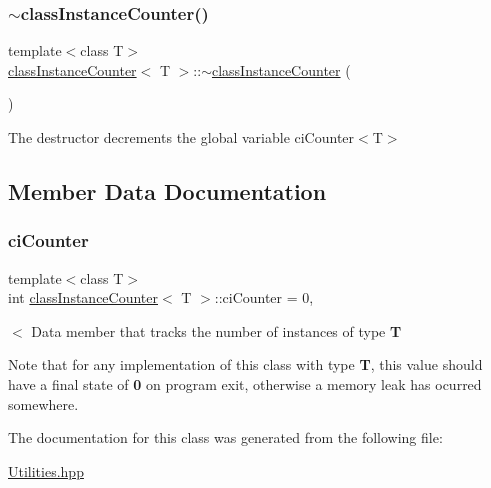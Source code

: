 \subsubsection{\texorpdfstring{$\sim$class\+Instance\+Counter()}{~classInstanceCounter()}}
{\footnotesize\ttfamily template$<$class T$>$ \\
\mbox{\hyperlink{classclass_instance_counter}{class\+Instance\+Counter}}$<$ T $>$\+::$\sim$\mbox{\hyperlink{classclass_instance_counter}{class\+Instance\+Counter}} (\begin{DoxyParamCaption}{ }\end{DoxyParamCaption})\hspace{0.3cm}{\ttfamily [inline]}}



The destructor decrements the global variable ci\+Counter$<$\+T$>$ 



\subsection{Member Data Documentation}
\mbox{\label{classclass_instance_counter_a990f94f1650bb05ade3f4deba9110806}} 
\subsubsection{\texorpdfstring{ci\+Counter}{ciCounter}}
{\footnotesize\ttfamily template$<$class T$>$ \\
int \mbox{\hyperlink{classclass_instance_counter}{class\+Instance\+Counter}}$<$ T $>$\+::ci\+Counter = 0\hspace{0.3cm}{\ttfamily [static]}, {\ttfamily [protected]}}



$<$ Data member that tracks the number of instances of type {\bfseries T} 

Note that for any implementation of this class with type {\bfseries T}, this value should have a final state of {\bfseries 0} on program exit, otherwise a memory leak has ocurred somewhere. 

The documentation for this class was generated from the following file\+:\begin{DoxyCompactItemize}
\item 
\mbox{\hyperlink{_utilities_8hpp}{Utilities.\+hpp}}\end{DoxyCompactItemize}
